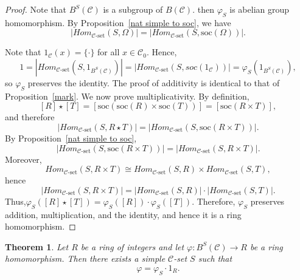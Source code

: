 \documentclass[a4paper]{article}
\newtheorem{thm}{Theorem}[section]
\theoremstyle{definition}
\theoremstyle{remark}
\newcommand*{\cat}[1]{\mathcal{#1}}
\begin{document}
\begin{proof}
Note that $B^S(\cat{C})$ is a subgroup of $B(\cat{C})$. then $\varphi_S$ is  abelian group homomorphism. By Proposition~\ref{nat simple to soc}, we have
\[
    |Hom_{\cat{C}\text{-set}}(S,\Omega)| = |Hom_{\cat{C}\text{-set}}(S,\mathrm{soc}(\Omega))|.
\]

Note that $1_{\cat{C}}(x)=\{ \cdot \}$ for all $x\in \cat{C}_0$. Hence,
\[
   1= |Hom_{\cat{C}\text{-set}}(S,1_{B^S(\cat{C})})| =| Hom_{\cat{C}\text{-set}}(S,soc(1_{\cat{C}}) )| = \varphi_S(1_{B^S(\cat{C})}),
\]
so $\varphi_S$ preserves the identity. The proof of additivity is identical to that of Proposition~\ref{mark}. We now prove multiplicativity. By definition,
\[
[R] \star [T] =[\mathrm{soc}(\mathrm{soc}(R)\times \mathrm{soc}(T))]= [\mathrm{soc}(R \times T)],
\]
and therefore
\[
\bigl|Hom_{\cat{C}\text{-set}}(S, R \star T)\bigr|
= \bigl|Hom_{\cat{C}\text{-set}}(S, \mathrm{soc}(R \times T))\bigr|.
\]
By Proposition~\ref{nat simple to soc},
\[
\bigl|Hom_{\cat{C}\text{-set}}(S, \mathrm{soc}(R \times T))\bigr|
= \bigl|Hom_{\cat{C}\text{-set}}(S, R \times T)\bigr|.
\]
Moreover,
\[
Hom_{\cat{C}\text{-set}}(S, R \times T)
\cong Hom_{\cat{C}\text{-set}}(S,R) \times Hom_{\cat{C}\text{-set}}(S,T),
\]
hence
\[
\bigl|Hom_{\cat{C}\text{-set}}(S, R \times T)\bigr|
= \bigl|Hom_{\cat{C}\text{-set}}(S,R)\bigr| \cdot \bigl|Hom_{\cat{C}\text{-set}}(S,T)\bigr|.
\]
Thus,$\varphi_S([R] \star [T])
= \varphi_S([R]) \cdot \varphi_S([T]).$
Therefore, $\varphi_S$ preserves addition, multiplication, and the identity, and hence it is a ring homomorphism.
\end{proof}
\begin{thm}\label{funtion and marcks}
Let $R$ be a ring of integers and let   $\varphi \colon B^S(\cat{C}) \to R$  be a ring homomorphism. Then there exists a simple $\cat{C}$-set $S$ such that
\[
    \varphi = \varphi_S\cdot 1_R.
\]
\end{thm}
\end{document}
